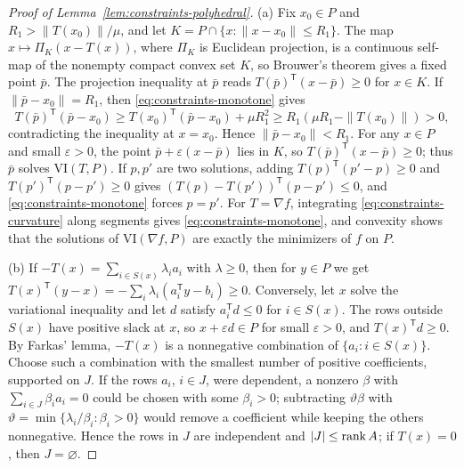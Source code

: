 \begin{proof}[Proof of Lemma~\ref{lem:constraints-polyhedral}]
(a) Fix $x_0\in P$ and $R_1>\|T(x_0)\|/\mu$, and let
$K=P\cap\{x:\|x-x_0\|\le R_1\}$. The map $x\mapsto\Pi_K(x-T(x))$, where
$\Pi_K$ is Euclidean projection, is a continuous self-map of the nonempty
compact convex set $K$, so Brouwer's theorem gives a fixed point $\bar p$.
The projection inequality at $\bar p$ reads $T(\bar p)^{\mathsf T}(x-\bar p)\ge0$
for $x\in K$. If $\|\bar p-x_0\|=R_1$, then \eqref{eq:constraints-monotone}
gives
\[
 T(\bar p)^{\mathsf T}(\bar p-x_0)\ge T(x_0)^{\mathsf T}(\bar p-x_0)+\mu R_1^2
 \ge R_1(\mu R_1-\|T(x_0)\|)>0,
\]
contradicting the inequality at $x=x_0$. Hence $\|\bar p-x_0\|<R_1$. For any
$x\in P$ and small $\varepsilon>0$, the point $\bar p+\varepsilon(x-\bar p)$
lies in $K$, so $T(\bar p)^{\mathsf T}(x-\bar p)\ge0$; thus $\bar p$ solves
$\mathrm{VI}(T,P)$. If $p,p'$ are two solutions, adding
$T(p)^{\mathsf T}(p'-p)\ge0$ and $T(p')^{\mathsf T}(p-p')\ge0$ gives
$(T(p)-T(p'))^{\mathsf T}(p-p')\le0$, and \eqref{eq:constraints-monotone}
forces $p=p'$. For $T=\nabla f$, integrating
\eqref{eq:constraints-curvature} along segments gives
\eqref{eq:constraints-monotone}, and convexity shows that the solutions of
$\mathrm{VI}(\nabla f,P)$ are exactly the minimizers of $f$ on $P$.

(b) If $-T(x)=\sum_{i\in S(x)}\lambda_ia_i$ with $\lambda\ge0$, then for
$y\in P$ we get $T(x)^{\mathsf T}(y-x)=-\sum_i\lambda_i(a_i^{\mathsf T}y-b_i)\ge0$.
Conversely, let $x$ solve the variational inequality and let $d$ satisfy
$a_i^{\mathsf T}d\le0$ for $i\in S(x)$. The rows outside $S(x)$ have positive
slack at $x$, so $x+\varepsilon d\in P$ for small $\varepsilon>0$, and
$T(x)^{\mathsf T}d\ge0$. By Farkas' lemma, $-T(x)$ is a nonnegative
combination of $\{a_i:i\in S(x)\}$. Choose such a combination with the
smallest number of positive coefficients, supported on $J$. If the rows
$a_i$, $i\in J$, were dependent, a nonzero $\beta$ with
$\sum_{i\in J}\beta_ia_i=0$ could be chosen with some $\beta_i>0$; subtracting
$\vartheta\beta$ with $\vartheta=\min\{\lambda_i/\beta_i:\beta_i>0\}$ would
remove a coefficient while keeping the others nonnegative. Hence the rows in
$J$ are independent and $|J|\le\operatorname{rank} A$; if $T(x)=0$, then $J=\varnothing$.


\end{proof}

